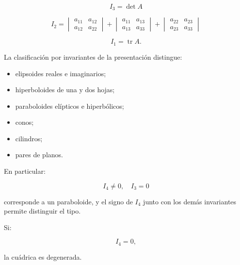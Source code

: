 \documentclass[11pt,a4paper]{article}
\newcommand{\tr}{\operatorname{tr}}
\begin{document}
\[
\boxed{
I_3=\det A
}
\]

\[
\boxed{
I_2=
\begin{vmatrix}
a_{11}&a_{12}\\
a_{12}&a_{22}
\end{vmatrix}
+
\begin{vmatrix}
a_{11}&a_{13}\\
a_{13}&a_{33}
\end{vmatrix}
+
\begin{vmatrix}
a_{22}&a_{23}\\
a_{23}&a_{33}
\end{vmatrix}
}
\]

\[
\boxed{
I_1=\tr A.
}
\]

La clasificación por invariantes de la presentación distingue:

\begin{itemize}
\item elipsoides reales e imaginarios;
\item hiperboloides de una y dos hojas;
\item paraboloides elípticos e hiperbólicos;
\item conos;
\item cilindros;
\item pares de planos.
\end{itemize}

En particular:

\[
I_4\neq0,\quad I_3=0
\]

corresponde a un paraboloide, y el signo de $I_4$ junto con los demás invariantes permite distinguir el tipo.

Si:

\[
I_4=0,
\]

la cuádrica es degenerada.
\end{document}
